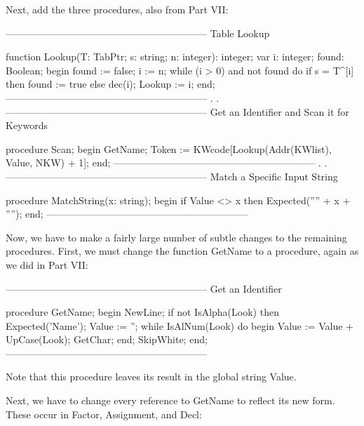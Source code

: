 \documentclass[float=false, crop=false]{standalone}
\begin{document}
Next, add the three procedures, also from Part VII:

\begin{code}
{--------------------------------------------------------------}
{ Table Lookup }

function Lookup(T: TabPtr; s: string; n: integer): integer;
var i: integer;
    found: Boolean;
begin
   found := false;
   i := n;
   while (i > 0) and not found do
      if s = T^[i] then
         found := true
      else
         dec(i);
   Lookup := i;
end;
{--------------------------------------------------------------}
.
.
{--------------------------------------------------------------}
{ Get an Identifier and Scan it for Keywords }

procedure Scan;
begin
   GetName;
   Token := KWcode[Lookup(Addr(KWlist), Value, NKW) + 1];
end;
{--------------------------------------------------------------}
.
.
{--------------------------------------------------------------}
{ Match a Specific Input String }

procedure MatchString(x: string);
begin
   if Value <> x then Expected('''' + x + '''');
end;
{--------------------------------------------------------------}
\end{code}

Now, we have to make a fairly large number of subtle changes to the remaining
procedures. First, we must change the function GetName to a procedure, again as
we did in Part VII:

\begin{code}
{--------------------------------------------------------------}
{ Get an Identifier }

procedure GetName;
begin
   NewLine;
   if not IsAlpha(Look) then Expected('Name');
   Value := '';
   while IsAlNum(Look) do begin
      Value := Value + UpCase(Look);
      GetChar;
   end;
   SkipWhite;
end;
{--------------------------------------------------------------}
\end{code}

Note that this procedure leaves its result in the global string Value.

Next, we have to change every reference to GetName to reflect its new form.
These occur in Factor, Assignment, and Decl:
\end{document}
